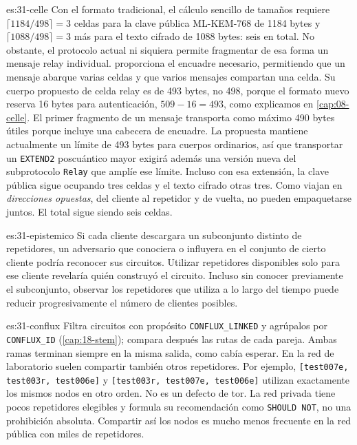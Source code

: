 \begin{soluzione}{es:31-celle}
Con el formato tradicional, el cálculo sencillo de tamaños requiere $\lceil1184/498\rceil=3$ celdas para la clave pública ML-KEM-768 de 1184 bytes y $\lceil1088/498\rceil=3$ más para el texto cifrado de 1088 bytes: seis en total. No obstante, el protocolo actual ni siquiera permite fragmentar de esa forma un mensaje relay individual.  proporciona el encuadre necesario, permitiendo que un mensaje abarque varias celdas y que varios mensajes compartan una celda. Su cuerpo propuesto de celda relay es de 493 bytes, no 498, porque el formato nuevo reserva 16 bytes para autenticación, $509-16=493$, como explicamos en \cref{cap:08-celle}. El primer fragmento de un mensaje transporta como máximo 490 bytes útiles porque incluye una cabecera de encuadre. La propuesta mantiene actualmente un límite de 493 bytes para cuerpos ordinarios, así que transportar un \texttt{EXTEND2} poscuántico mayor exigirá además una versión nueva del subprotocolo \texttt{Relay} que amplíe ese límite. Incluso con esa extensión, la clave pública sigue ocupando tres celdas y el texto cifrado otras tres. Como viajan en \emph{direcciones opuestas}, del cliente al repetidor y de vuelta, no pueden empaquetarse juntos. El total sigue siendo seis celdas.
\end{soluzione}

\begin{soluzione}{es:31-epistemico}
Si cada cliente descargara un subconjunto distinto de repetidores, un adversario que conociera o influyera en el conjunto de cierto cliente podría reconocer sus circuitos. Utilizar repetidores disponibles solo para ese cliente revelaría quién construyó el circuito. Incluso sin conocer previamente el subconjunto, observar los repetidores que utiliza a lo largo del tiempo puede reducir progresivamente el número de clientes posibles.
\end{soluzione}

\begin{soluzione}{es:31-conflux}
Filtra circuitos con propósito \texttt{CONFLUX\_LINKED} y agrúpalos por \texttt{CONFLUX\_ID} (\cref{cap:18-stem}); compara después las rutas de cada pareja. Ambas ramas terminan siempre en la misma salida, como cabía esperar. En la red de laboratorio suelen compartir también otros repetidores. Por ejemplo, \texttt{[test007e, test003r, test006e]} y \texttt{[test003r, test007e, test006e]} utilizan exactamente los mismos nodos en otro orden. No es un defecto de tor. La red privada tiene pocos repetidores elegibles y  formula su recomendación como \texttt{SHOULD NOT}, no una prohibición absoluta. Compartir así los nodos es mucho menos frecuente en la red pública con miles de repetidores.
\end{soluzione}

